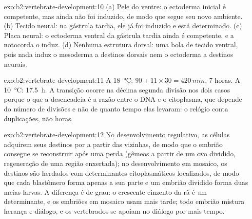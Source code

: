 \begin{solution}{exo:b2:vertebrate-development:10}
(a) Pele do ventre: o ectoderma inicial é competente, mas ainda não foi
induzido, de modo que segue seu novo ambiente. (b) Tecido neural: na
gástrula tardia, ele já foi induzido e está determinado. (c) Placa
neural: o ectoderma ventral da gástrula tardia ainda é competente, e a
notocorda o induz. (d) Nenhuma estrutura dorsal: uma bola de tecido
ventral, pois nada induz o mesoderma a destinos dorsais nem o
ectoderma a destinos neurais.
\end{solution}

\begin{solution}{exo:b2:vertebrate-development:11}
A \qty{18}{\celsius}: $90 + 11\times 30 = \qty{420}{min}$, 7 horas.
A \qty{10}{\celsius}: \qty{17.5}{h}. A transição ocorre na décima
segunda divisão nos dois casos porque o que a desencadeia é a razão
entre o DNA e o citoplasma, que depende do número de divisões e não de
quanto tempo elas levaram: o relógio conta duplicações, não horas.
\end{solution}

\begin{solution}{exo:b2:vertebrate-development:12}
No desenvolvimento regulativo, as células adquirem seus destinos por
 a partir das vizinhas, de modo que o embrião consegue se
reconstruir após uma perda (gêmeos a partir de um ovo dividido,
regeneração de uma região enxertada); no desenvolvimento em mosaico, os
destinos são herdados com determinantes citoplasmáticos localizados,
de modo que cada blastômero forma apenas a sua parte e um embrião
dividido forma duas meias larvas. A diferença é de grau: o crescente
cinzento da rã é um determinante, e os embriões em mosaico usam
 mais tarde; todo embrião mistura herança e diálogo, e os
vertebrados se apoiam no diálogo por mais tempo.
\end{solution}

